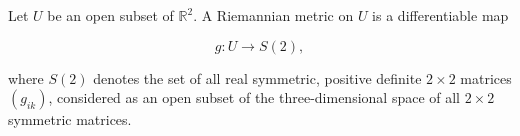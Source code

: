 Let $U$ be an open subset of $\mathbb{R}^2$. A Riemannian metric on $U$ is a differentiable map

$$g: U \rightarrow S(2),$$

where $S(2)$ denotes the set of all real symmetric, positive definite $2 \times 2$ matrices $(g_{ik})$, considered as an open subset of the three-dimensional space of all $2 \times 2$ symmetric matrices.
